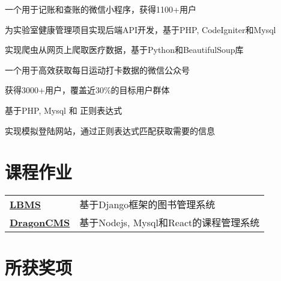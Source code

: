 \documentclass[]{deedy-resume-openfont}
\begin{document}
\begin{minipage}[t]{0.73\textwidth}
\begin{tightemize}
    \item 一个用于记账和查账的微信小程序，获得1100+用户
    \end{tightemize}
\sectionsep

\begin{tightemize}
    \item 为实验室健康管理项目实现后端API开发，基于PHP, CodeIgniter和Mysql
    \item 实现爬虫从网页上爬取医疗数据，基于Python和BeautifulSoup库
    \end{tightemize}
\sectionsep

\begin{tightemize}
    \item 一个用于高效获取每日运动打卡数据的微信公众号
    \item 获得3000+用户，覆盖近30\%的目标用户群体
    \item 基于PHP, Mysql 和 正则表达式
    \item 实现模拟登陆网站，通过正则表达式匹配获取需要的信息
    \end{tightemize}
\sectionsep




\section{课程作业}

\begin{tabular}{ll}
\href{https://github.com/vinci7/LBMS-by-Django}{\bf LBMS} & 基于Django框架的图书管理系统 \\
\href{https://coding.net/u/vinchi/p/DragonCMS}{\bf DragonCMS} & 基于Nodejs, Mysql和React的课程管理系统\\
\end{tabular}
\sectionsep


\section{所获奖项}


\end{minipage}
\end{document}
